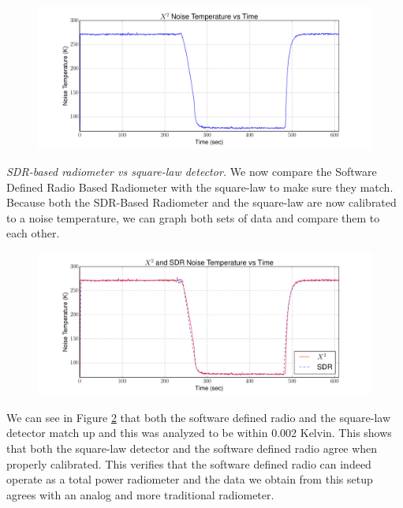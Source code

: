 \begin{figure}[h!tb] \centering
\includegraphics[width=\textwidth]{Experiments/Exp1/x2_calibrated.pdf}
\label{X2_Calibrated}
\end{figure}

\emph{SDR-based radiometer vs square-law detector.}  We now compare the Software Defined Radio Based Radiometer with the square-law to make sure they match.  Because both the SDR-Based Radiometer and the square-law are now calibrated to a noise temperature, we can graph both sets of data and compare them to each other.

\begin{figure}[h!tb] \centering

\includegraphics[width=\textwidth]{Experiments/Exp1/x2_SDR_Calibrated.pdf}
\label{X2_SDR_Both}
\end{figure}

We can see in Figure \ref{X2_SDR_Both} that both the software defined radio and the square-law detector match up and this was analyzed to be within 0.002 Kelvin.  This shows that both the square-law detector and the software defined radio agree when properly calibrated.  This verifies that the software defined radio can indeed operate as a total power radiometer and the data we obtain from this setup agrees with an analog and more traditional radiometer.

